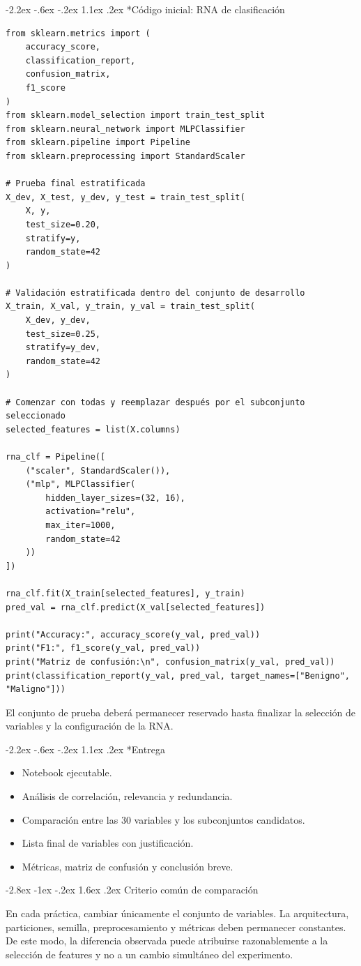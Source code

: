 \documentclass[11pt,a4paper]{article}
\makeatletter
\newcommand{\bloquesec}[1]{\section{#1}}
\newcommand{\apartado}[1]{\subsection*{#1}}
\renewcommand\section{\@startsection{section}{1}{\z@}%
  {-2.8ex \@plus -1ex \@minus -.2ex}%
  {1.6ex \@plus.2ex}%
  {\normalfont\LARGE\bfseries\color{UAPNavy}}}
\renewcommand\subsection{\@startsection{subsection}{2}{\z@}%
  {-2.2ex \@plus -.6ex \@minus -.2ex}%
  {1.1ex \@plus.2ex}%
  {\normalfont\Large\bfseries\color{UAPTeal}}}
\makeatother
\begin{document}
\apartado{Código inicial: RNA de clasificación}

\begin{lstlisting}
from sklearn.metrics import (
    accuracy_score,
    classification_report,
    confusion_matrix,
    f1_score
)
from sklearn.model_selection import train_test_split
from sklearn.neural_network import MLPClassifier
from sklearn.pipeline import Pipeline
from sklearn.preprocessing import StandardScaler

# Prueba final estratificada
X_dev, X_test, y_dev, y_test = train_test_split(
    X, y,
    test_size=0.20,
    stratify=y,
    random_state=42
)

# Validación estratificada dentro del conjunto de desarrollo
X_train, X_val, y_train, y_val = train_test_split(
    X_dev, y_dev,
    test_size=0.25,
    stratify=y_dev,
    random_state=42
)

# Comenzar con todas y reemplazar después por el subconjunto seleccionado
selected_features = list(X.columns)

rna_clf = Pipeline([
    ("scaler", StandardScaler()),
    ("mlp", MLPClassifier(
        hidden_layer_sizes=(32, 16),
        activation="relu",
        max_iter=1000,
        random_state=42
    ))
])

rna_clf.fit(X_train[selected_features], y_train)
pred_val = rna_clf.predict(X_val[selected_features])

print("Accuracy:", accuracy_score(y_val, pred_val))
print("F1:", f1_score(y_val, pred_val))
print("Matriz de confusión:\n", confusion_matrix(y_val, pred_val))
print(classification_report(y_val, pred_val, target_names=["Benigno", "Maligno"]))
\end{lstlisting}

El conjunto de prueba deberá permanecer reservado hasta finalizar la selección de variables y la configuración de la RNA.

\apartado{Entrega}

\begin{itemize}
  \item Notebook ejecutable.
  \item Análisis de correlación, relevancia y redundancia.
  \item Comparación entre las 30 variables y los subconjuntos candidatos.
  \item Lista final de variables con justificación.
  \item Métricas, matriz de confusión y conclusión breve.
\end{itemize}

\bloquesec{Criterio común de comparación}

\noindent\colorbox{UAPLight}{\parbox{\dimexpr\linewidth-2\fboxsep\relax}{%
En cada práctica, cambiar únicamente el conjunto de variables. La arquitectura, particiones, semilla, preprocesamiento y métricas deben permanecer constantes. De este modo, la diferencia observada puede atribuirse razonablemente a la selección de features y no a un cambio simultáneo del experimento.%
}}
\end{document}
